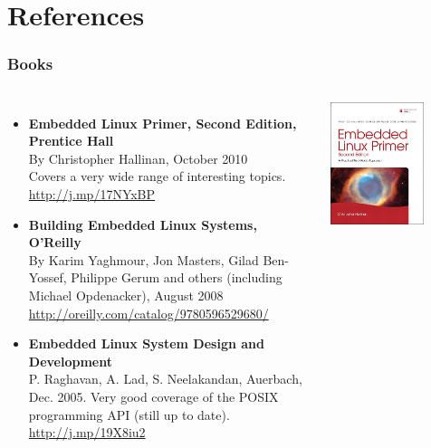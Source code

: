 \section{References}

\begin{frame}
  \frametitle{Books}
  \begin{columns}
    \small
    \begin{itemize}
    \item {\bf Embedded Linux Primer, Second Edition, Prentice Hall}\\
      By Christopher Hallinan, October 2010\\
      Covers a very wide range of interesting topics.\\
      \url{http://j.mp/17NYxBP}
    \item {\bf Building Embedded Linux Systems, O'Reilly}\\
      By Karim Yaghmour, Jon Masters, Gilad Ben-Yossef, Philippe
      Gerum and others (including Michael Opdenacker), August 2008\\
      \url{http://oreilly.com/catalog/9780596529680/}
    \item {\bf Embedded Linux System Design and Development}\\
      P. Raghavan, A. Lad, S. Neelakandan, Auerbach, Dec. 2005.
      Very good coverage of the POSIX programming API (still up
      to date).\\
      \url{http://j.mp/19X8iu2}
    \end{itemize}
    \normalsize
    \includegraphics[width=0.7\textwidth]{slides/sysdev-embedded-linux/book-embedded-linux-primer2.jpg}\\

\end{columns}
\end{frame}
